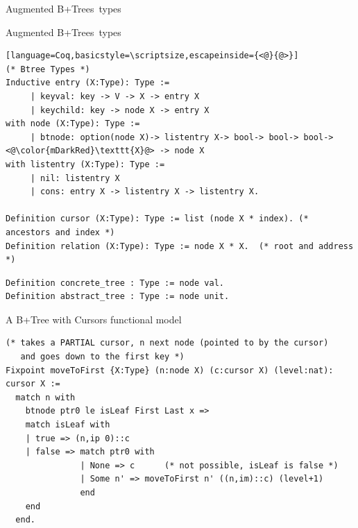 \documentclass[page number,usenames,dvipsnames]{beamer}
\def\btrees{B+Trees}
\begin{document}
\begin{frame}{Augmented \btrees\ types}
  \cursorsep
\end{frame}

\begin{frame}[fragile]{Augmented \btrees\ types}

  \begin{lstlisting}[language=Coq,basicstyle=\scriptsize,escapeinside={<@}{@>}]
(* Btree Types *)
Inductive entry (X:Type): Type :=
     | keyval: key -> V -> X -> entry X
     | keychild: key -> node X -> entry X
with node (X:Type): Type :=
     | btnode: option(node X)-> listentry X-> bool-> bool-> bool-> <@\color{mDarkRed}\texttt{X}@> -> node X
with listentry (X:Type): Type :=
     | nil: listentry X
     | cons: entry X -> listentry X -> listentry X.

Definition cursor (X:Type): Type := list (node X * index). (* ancestors and index *)
Definition relation (X:Type): Type := node X * X.  (* root and address *)
  \end{lstlisting}
  \vfill
  \begin{lstlisting}[language=Coq]
Definition concrete_tree : Type := node val.
Definition abstract_tree : Type := node unit.
  \end{lstlisting}

  
\end{frame}

\begin{frame}[fragile]{A B+Tree with Cursors functional model}

  \begin{lstlisting}[language=Coq,basicstyle=\scriptsize]
(* takes a PARTIAL cursor, n next node (pointed to by the cursor)
   and goes down to the first key *)
Fixpoint moveToFirst {X:Type} (n:node X) (c:cursor X) (level:nat): cursor X :=
  match n with
    btnode ptr0 le isLeaf First Last x =>
    match isLeaf with
    | true => (n,ip 0)::c
    | false => match ptr0 with
               | None => c      (* not possible, isLeaf is false *)
               | Some n' => moveToFirst n' ((n,im)::c) (level+1)
               end
    end
  end.
\end{lstlisting}
  
\end{frame}
\end{document}
